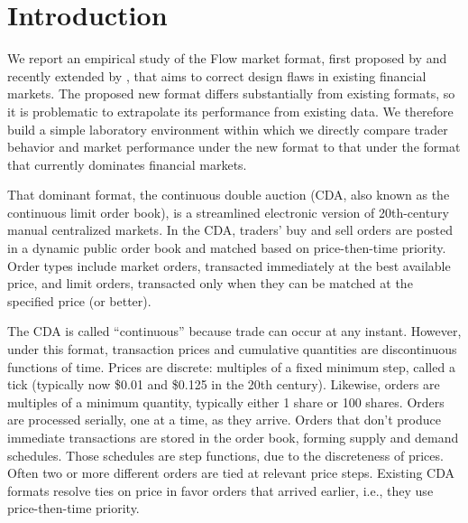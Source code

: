 \documentclass[12pt]{article}
\begin{document}
\newpage

\section{Introduction} \label{introduction}

We report an empirical study of the Flow market format, first proposed by \cite{Kyle2017} and recently extended by \cite{Budish2023}, that aims to 
correct design flaws in existing financial markets. 
The proposed new format differs substantially from existing formats,
so it is problematic to extrapolate its performance from existing data. 
We therefore build a simple laboratory environment within which we directly compare trader behavior and market performance under the new format to that under the format that currently dominates financial markets.

That dominant format, the continuous double auction (CDA, also known as the continuous limit order book), is a streamlined electronic version of 20th-century manual centralized markets. In the CDA, traders' buy and sell orders are posted in a dynamic public order book and matched based on price-then-time priority. Order types include market orders, transacted immediately at the best available price, and limit orders, transacted only when they can be matched at the specified price (or better). 

The CDA is called “continuous” because trade can occur at any instant. 
However, under this format, transaction prices and cumulative quantities are discontinuous functions of time. 
Prices are discrete: multiples of a fixed minimum step, called a tick (typically now \$0.01 and \$0.125 in the 20th century). 
Likewise, orders are multiples of a minimum quantity,
typically either 1 share or 100 shares. 
Orders are processed serially, one at a time, as they arrive. 
Orders that don't produce immediate transactions are stored in the order book, forming supply and demand schedules. 
Those schedules are step functions, due to the   discreteness of prices. 
Often two or more different orders are tied at relevant price steps.
Existing CDA formats resolve ties on price in favor orders that arrived earlier, i.e., they use price-then-time priority. 
\end{document}
